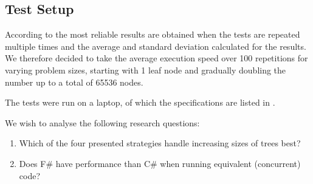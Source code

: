 \subsection{Test Setup}
According to \cite{sestoft2013microbenchmarks} the most reliable results are obtained when the tests are repeated multiple times and the average and standard deviation calculated for the results. We therefore decided to take the average execution speed over 100 repetitions for varying problem sizes, starting with 1 leaf node and gradually doubling the number up to a total of 65536 nodes.

The tests were run on a laptop, of which the specifications are listed in .


We wish to analyse the following research questions:
\begin{enumerate}
    \item Which of the four presented strategies handle increasing sizes of trees best?
    \item Does F\# have performance than C\# when running equivalent (concurrent) code? 
\end{enumerate}

